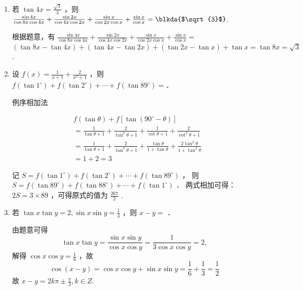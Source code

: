 \begin{enumerate}
\item 若 $\tan 4 x=\frac{\sqrt{3}}{3}$ ，则 $\frac{\sin 4 x}{\cos 8 x \cos 4 x}+\frac{\sin 2 x}{\cos 4 x \cos 2 x}+\frac{\sin x}{\cos 2 x \cos x}+\frac{\sin x}{\cos x}=\blkda{$\sqrt{3}$}$.

\begin{jieda}
   根据题意，有 $\frac{\sin 4 x}{\cos 8 x \cos 4 x}+\frac{\sin 2 x}{\cos 4 x \cos 2 x}+\frac{\sin x}{\cos 2 x \cos x}+\frac{\sin x}{\cos x}=$ $(\tan 8 x-\tan 4 x)+(\tan 4 x-\tan 2 x)+(\tan 2 x-\tan x)+\tan x=\tan 8 x=\sqrt{3}$.
\end{jieda}



\item 设 $f(x)=\frac{1}{x+1}+\frac{2}{x^2+1}$ ，则 $f\left(\tan 1^{\circ}\right)+f\left(\tan 2^{\circ}\right)+\cdots+f\left(\tan 89^{\circ}\right)=$．
\begin{jieda}
例序相加法

$$
\begin{aligned}
& f(\tan \theta)+f\left[\tan \left(90^{\circ}-\theta\right)\right] \\
& =\frac{1}{\tan \theta+1}+\frac{2}{\tan ^2 \theta+1}+\frac{1}{\cot \theta+1}+\frac{2}{\cot ^2 \theta+1} \\
& =\frac{1}{\tan \theta+1}+\frac{2}{\tan ^2 \theta+1}+\frac{\tan \theta}{1+\tan \theta}+\frac{2 \tan ^2 \theta}{1+\tan ^2 \theta} \\
& =1+2=3
\end{aligned}
$$

记 $S=f\left(\tan 1^{\circ}\right)+f\left(\tan 2^{\circ}\right)+\cdots+f\left(\tan 89^{\circ}\right)$ ，
则 $S=f\left(\tan 89^{\circ}\right)+f\left(\tan 88^{\circ}\right)+\cdots+f\left(\tan 1^{\circ}\right)$ ．
两式相加可得： $2 S=3 \times 89$ ，可得原式的值为 $\frac{267}{2}$ .
\end{jieda}

\item 若 $\tan x \tan y=2, \sin x \sin y=\frac{1}{3}$ ，则 $x-y=$ ．
\begin{jieda}
    由题意可得
$$
\tan x \tan y=\frac{\sin x \sin y}{\cos x \cos y}=\frac{1}{3 \cos x \cos y}=2,
$$
解得 $\cos x \cos y=\frac{1}{6}$ ，故
$$
\cos (x-y)=\cos x \cos y+\sin x \sin y=\frac{1}{6}+\frac{1}{3}=\frac{1}{2}
$$
故 $x-y=2 k \pi \pm \frac{\pi}{3}, k \in Z$.
\end{jieda}

\end{enumerate}

